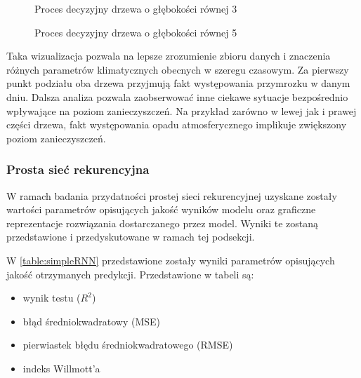\documentclass[10pt,a4paper]{article}
\begin{document}
\begin{figure}[!ht]
	\centering
	\caption{Proces decyzyjny drzewa o głębokości równej 3}
	\label{figure:tree_graph_small}
\end{figure}
\FloatBarrier

\begin{figure}[!ht]
	\centering
	\caption{Proces decyzyjny drzewa o głębokości równej 5}
	\label{figure:tree_graph}
\end{figure}
\FloatBarrier
Taka wizualizacja pozwala na lepsze zrozumienie zbioru danych i znaczenia różnych parametrów klimatycznych obecnych w szeregu czasowym. Za pierwszy punkt podziału oba drzewa przyjmują fakt występowania przymrozku w danym dniu. Dalsza analiza pozwala zaobserwować inne ciekawe sytuacje bezpośrednio wpływające na poziom zanieczyszczeń. Na przykład zarówno w lewej jak i prawej części drzewa, fakt występowania opadu atmosferycznego implikuje zwiększony poziom zanieczyszczeń. 

\subsubsection{Prosta sieć rekurencyjna}
W ramach badania przydatności prostej sieci rekurencyjnej uzyskane zostały wartości parametrów opisujących jakość wyników modelu oraz graficzne reprezentacje rozwiązania dostarczanego przez model. Wyniki te zostaną przedstawione i przedyskutowane w ramach tej podsekcji.


W \autoref{table:simpleRNN} przedstawione zostały wyniki parametrów opisujących jakość otrzymanych predykcji. Przedstawione w tabeli są:
\begin{center}
	\begin{itemize}
		\item wynik testu ($R^2$)
		\item błąd średniokwadratowy (MSE)
		\item pierwiastek błędu średniokwadratowego (RMSE)
		\item indeks Willmott'a
	\end{itemize}
\end{center}
\end{document}
